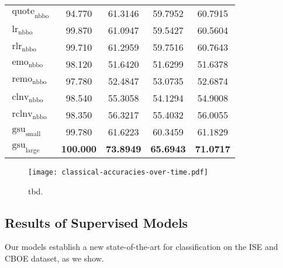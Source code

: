 \begin{table}
\begin{tabular}{lSSSS}
        $\operatorname{quote}_{\mathrm{nbbo}}$ & 94.770            & 61.3146                            & 59.7952           & 60.7915           \\
        $\operatorname{lr}_{\mathrm{nbbo}}$    & 99.870            & 61.0947                            & 59.5427           & 60.5604           \\
        $\operatorname{rlr}_{\mathrm{nbbo}}$   & 99.710            & 61.2959                            & 59.7516           & 60.7643           \\
        $\operatorname{emo}_{\mathrm{nbbo}}$   & 98.120            & 51.6420                            & 51.6299           & 51.6378           \\
        $\operatorname{remo}_{\mathrm{nbbo}}$  & 97.780            & 52.4847                            & 53.0735           & 52.6874           \\
        $\operatorname{clnv}_{\mathrm{nbbo}}$  & 98.540            & 55.3058                            & 54.1294           & 54.9008           \\
        $\operatorname{rclnv}_{\mathrm{nbbo}}$ & 98.350            & 56.3217                            & 55.4032           & 56.0055           \\\midrule
        $\operatorname{gsu}_{\mathrm{small}}$  & 99.780            & 61.6223                            & 60.3459           & 61.1829           \\
        $\operatorname{gsu}_{\mathrm{large}}$  & \bfseries 100.000 & \bfseries 73.8949                  & \bfseries 65.6943 & \bfseries 71.0717 \\\bottomrule
    \end{tabular}
\end{table}



\begin{figure}[ht]
    \centering
    \texttt{[image: classical-accuracies-over-time.pdf]}
    \caption[tbd]{tbd.}
    \label{fig:classical-accuracies-over-time}
\end{figure}


\subsection{Results of Supervised
    Models}\label{sec:results-of-supervised-models}

Our models establish a new state-of-the-art for classification on the \gls{ISE} and \gls{CBOE} dataset, as we show.

